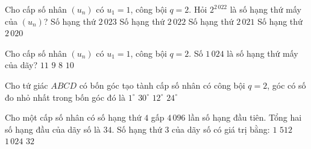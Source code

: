 \begin{ex}%
	Cho cấp  số nhân $(u_n)$ có $u_1=1$, công bội $q=2$. Hỏi $2^{2\,022}$ là số hạng thứ mấy của $(u_n)$?
	 \choice
		{\True Số hạng thứ  $2\,023$}
		{Số  hạng thứ $2\,022$}
		{Số hạng thứ  $2\,021$}
		{Số hạng  thứ $2\,020$}
\end{ex}

\begin{ex}%
	Cho cấp số nhân $(u_n)$ có $u_1=1$, công bội $q=2$.  Số $1\,024$ là số hạng thứ mấy của dãy?
	 \choice
		 {\True $11$}
		 {$9$}
		{$8$} 
		{$10$} 
\end{ex}

\begin{ex}%
	Cho tứ giác $ABCD$ có bốn góc tạo tành cấp số nhân có công bội $q=2$, góc có số đo nhỏ  nhất trong bốn góc đó là
	\choice 
		 {$1^{\circ}$}
		{$30^{\circ}$} 
		 {$12^{\circ}$}
		{\True  $24^{\circ}$}
\end{ex}

\begin{ex}%
	Cho một cấp số nhân có số hạng thứ $4$ gấp $4\,096$ lần số hạng đầu tiên. Tổng hai số hạng  đầu của dãy số là $34$. Số hạng thứ $3$ của dãy số có giá trị bằng:
	 \choice
		{$1$} 
		{\True  $512$}
		{$1\,024$} 
		 {$32$}
\end{ex}

